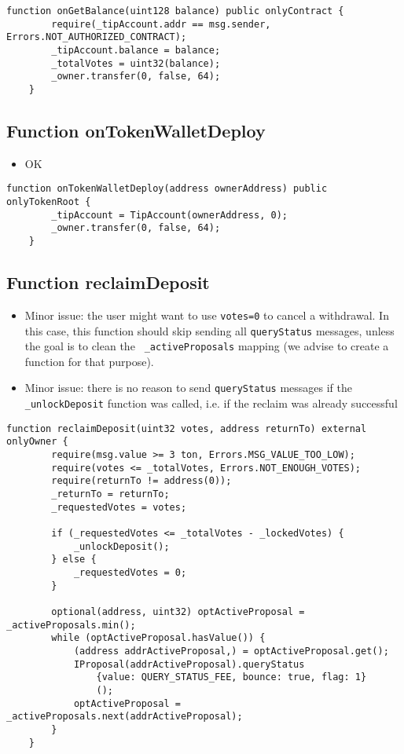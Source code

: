 \begin{lstlisting}[firstnumber=181]
    function onGetBalance(uint128 balance) public onlyContract {
        require(_tipAccount.addr == msg.sender, Errors.NOT_AUTHORIZED_CONTRACT);
        _tipAccount.balance = balance;
        _totalVotes = uint32(balance);
        _owner.transfer(0, false, 64);
    }
\end{lstlisting}

\subsection{Function onTokenWalletDeploy}

\begin{itemize}
\item OK
\end{itemize}

\begin{lstlisting}[firstnumber=192]
    function onTokenWalletDeploy(address ownerAddress) public onlyTokenRoot {
        _tipAccount = TipAccount(ownerAddress, 0);
        _owner.transfer(0, false, 64);
    }
\end{lstlisting}

\subsection{Function reclaimDeposit}

\begin{itemize}
\item Minor issue: the user might want to use {\tt votes=0} to cancel
  a withdrawal. In this case, this function should skip sending all
  {\tt queryStatus} messages, unless the goal is to clean the {\tt
    \_activeProposals} mapping (we advise to create a function for that
  purpose).
\item Minor issue: there is no reason to send {\tt queryStatus}
  messages if the {\tt \_unlockDeposit} function was called, i.e. if
  the reclaim was already successful
\end{itemize}

\begin{lstlisting}[firstnumber=103]
    function reclaimDeposit(uint32 votes, address returnTo) external onlyOwner {
        require(msg.value >= 3 ton, Errors.MSG_VALUE_TOO_LOW);
        require(votes <= _totalVotes, Errors.NOT_ENOUGH_VOTES);
        require(returnTo != address(0));
        _returnTo = returnTo;
        _requestedVotes = votes;

        if (_requestedVotes <= _totalVotes - _lockedVotes) {
            _unlockDeposit();
        } else {
            _requestedVotes = 0;
        }

        optional(address, uint32) optActiveProposal = _activeProposals.min();
        while (optActiveProposal.hasValue()) {
            (address addrActiveProposal,) = optActiveProposal.get();
            IProposal(addrActiveProposal).queryStatus
                {value: QUERY_STATUS_FEE, bounce: true, flag: 1}
                ();
            optActiveProposal = _activeProposals.next(addrActiveProposal);
        }
    }
\end{lstlisting}

